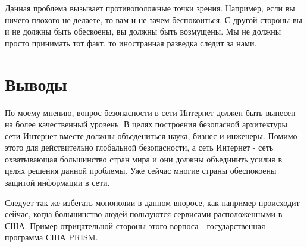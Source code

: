 \documentclass[11pt, a4paper]{article}		%
\begin{document}
Данная проблема вызывает противоположные точки зрения. Например, если вы ничего плохого не делаете, то вам и не зачем беспокоиться. С другой стороны вы и не должны быть обескоены, вы должны быть возмущены. Мы не должны просто принимать тот факт, то иностранная разведка следит за нами.




\section{Выводы}

По моему мнению, вопрос безопасности в сети Интернет должен быть вынесен на более качественный уровень. В целях построения безопасной архитектуры сети Интернет вместе должны объедениться наука, бизнес и инженеры. Помимо этого для действительно глобальной безопасности, а сеть Интернет - сеть охватывающая большинство стран мира и они должны объединить усилия в целях решения данной проблемы. Уже сейчас многие страны обеспокоены защитой информации в сети.

Следует так же избегать монополии в данном впоросе, как например происходит сейчас, когда большинство людей пользуются сервисами расположенными в США. Пример отрицательной стороны этого ворпоса - государственная программа США PRISM.
\end{document}

